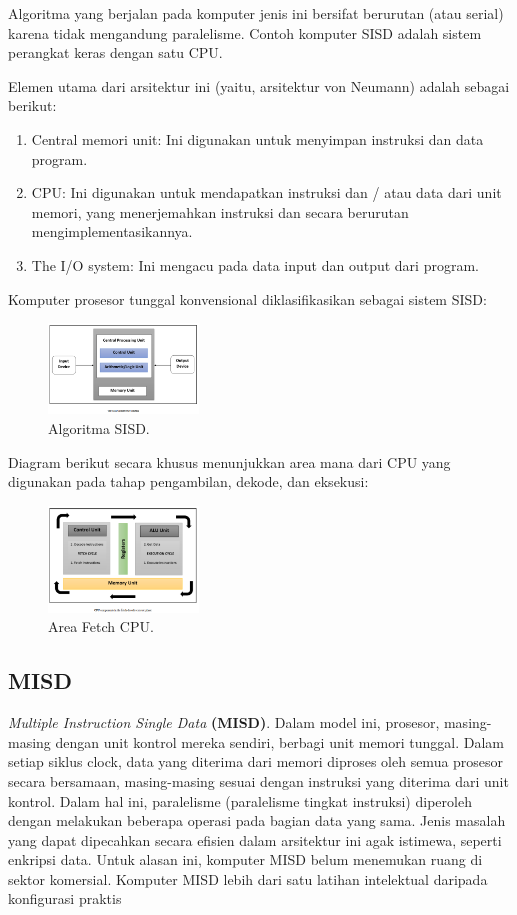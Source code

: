 \noindent
Algoritma yang berjalan pada komputer jenis ini bersifat berurutan (atau serial) karena tidak mengandung paralelisme. Contoh komputer SISD adalah sistem perangkat keras dengan satu CPU.

\noindent
Elemen utama dari arsitektur ini (yaitu, arsitektur von Neumann) adalah sebagai berikut:

\begin{enumerate}
	\item Central memori unit: Ini digunakan untuk menyimpan instruksi dan data program.
	\item CPU: Ini digunakan untuk mendapatkan instruksi dan / atau data dari unit memori, yang menerjemahkan instruksi dan secara berurutan mengimplementasikannya.
	\item The I/O system: Ini mengacu pada data input dan output dari program.
\end{enumerate}

\noindent
Komputer prosesor tunggal konvensional diklasifikasikan sebagai sistem SISD:

\begin{figure}[H]
	\includegraphics[width=4cm]{figures/kelompok2/chapter1/3.png}
	\centering
	\caption{Algoritma SISD.}
\end{figure}

\noindent
Diagram berikut secara khusus menunjukkan area mana dari CPU yang digunakan pada tahap pengambilan, dekode, dan eksekusi:

\begin{figure}[H]
	\includegraphics[width=4cm]{figures/kelompok2/chapter1/4.png}
	\centering
	\caption{Area Fetch CPU.}
\end{figure}

\subsection{MISD}
\textit{Multiple Instruction Single Data} \textbf{(MISD)}. Dalam model ini, prosesor, masing-masing dengan unit kontrol mereka sendiri, berbagi unit memori tunggal. Dalam setiap siklus clock, data yang diterima dari memori diproses oleh semua prosesor secara bersamaan, masing-masing sesuai dengan instruksi yang diterima dari unit kontrol. Dalam hal ini, paralelisme (paralelisme tingkat instruksi) diperoleh dengan melakukan beberapa operasi pada bagian data yang sama. Jenis masalah yang dapat dipecahkan secara efisien dalam arsitektur ini agak istimewa, seperti enkripsi data. Untuk alasan ini, komputer MISD belum menemukan ruang di sektor komersial. Komputer MISD lebih dari satu latihan intelektual daripada konfigurasi praktis

